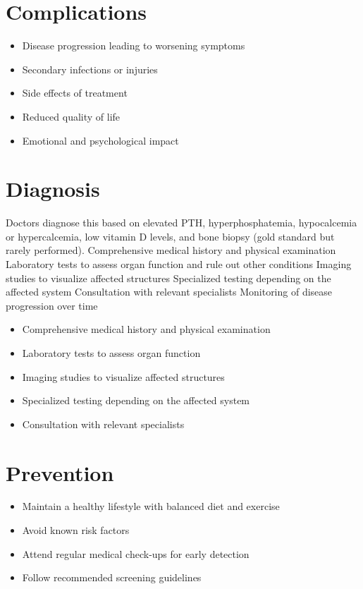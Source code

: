 \section{Complications}
\begin{itemize}[noitemsep]
  \item Disease progression leading to worsening symptoms
  \item Secondary infections or injuries
  \item Side effects of treatment
  \item Reduced quality of life
  \item Emotional and psychological impact
\end{itemize}
\section{Diagnosis}
Doctors diagnose this based on elevated PTH, hyperphosphatemia, hypocalcemia or hypercalcemia, low vitamin D levels, and bone biopsy (gold standard but rarely performed). Comprehensive medical history and physical examination Laboratory tests to assess organ function and rule out other conditions Imaging studies to visualize affected structures Specialized testing depending on the affected system Consultation with relevant specialists Monitoring of disease progression over time

\begin{itemize}[noitemsep]
  \item Comprehensive medical history and physical examination
  \item Laboratory tests to assess organ function
  \item Imaging studies to visualize affected structures
  \item Specialized testing depending on the affected system
  \item Consultation with relevant specialists
\end{itemize}
\section{Prevention}
\begin{itemize}[noitemsep]
  \item Maintain a healthy lifestyle with balanced diet and exercise
  \item Avoid known risk factors
  \item Attend regular medical check-ups for early detection
  \item Follow recommended screening guidelines
\end{itemize}
